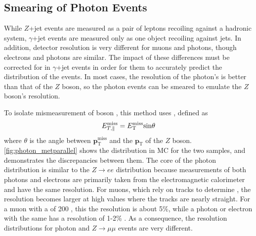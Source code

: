 \subsection{Smearing of Photon Events}
\label{sec:photon_smearing}

While $Z$+jet events are measured as a pair of leptons recoiling against a hadronic system, $\gamma$+jet events are measured only as one  object recoiling against jets. In addition, detector resolution is very different for muons and photons, though electrons and photons are similar. The impact of these differences must be corrected for in $\gamma$+jet events in order for them to accurately predict the \met distribution of the \dyjets events. In most cases, the resolution of the photon's \pt is better than that of the $Z$ boson, so the photon events can be smeared to emulate the $Z$ boson's resolution.  

To isolate mismeasurement of boson \pt, this method uses \metl, defined as
%
\begin{equation}
E_{T,\parallel}^{\mathrm{miss}} = E_{\text{T}}^{\text{miss}} \mathrm{sin} \theta
\end{equation}
%
where $\theta$ is the angle between ${\boldsymbol p}_{\mathrm{T}}^\mathrm{miss}$ and the ${\boldsymbol p}_{\mathrm{T}}$ of the $Z$ boson. \autoref{fig:photon_metparallel} shows the \metl distribution in \ac{MC} for the two samples, and demonstrates the discrepancies between them. The core of the photon distribution is similar to the $Z\rightarrow ee$ distribution because measurements of both photons and electrons are primarily taken from the electromagnetic calorimeter and have the same resolution. For muons, which rely on tracks to determine \pt, the resolution becomes larger at high \pt values where the tracks are nearly straight. For a muon with a \pt of 200 \gev, this the resolution is about 5\%, while a photon or electron with the same \pt has a resolution of 1-2\% \cite{Aad:2014zya, Aad:2014nim}. As a consequence, the resolution distributions for photon and $Z\rightarrow\mu\mu$ events are very different. 

